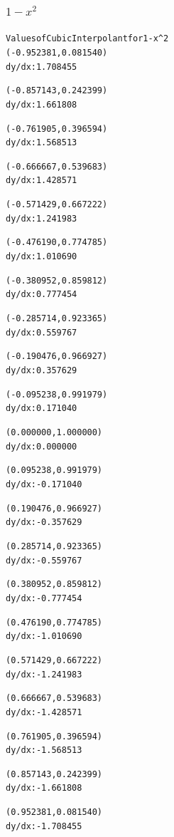 \documentclass[11pt]{article} %
\begin{document}
\subsubsection*{$1-x^2$}
\begin{alltt}
 Values of Cubic Interpolant for 1-x^2
(-0.952381, 0.081540)
 dy/dx:	1.708455

(-0.857143, 0.242399)
 dy/dx:	1.661808

(-0.761905, 0.396594)
 dy/dx:	1.568513

(-0.666667, 0.539683)
 dy/dx:	1.428571

(-0.571429, 0.667222)
 dy/dx:	1.241983

(-0.476190, 0.774785)
 dy/dx:	1.010690

(-0.380952, 0.859812)
 dy/dx:	0.777454

(-0.285714, 0.923365)
 dy/dx:	0.559767

(-0.190476, 0.966927)
 dy/dx:	0.357629

(-0.095238, 0.991979)
 dy/dx:	0.171040

(0.000000, 1.000000)
 dy/dx:	0.000000

(0.095238, 0.991979)
 dy/dx:	-0.171040

(0.190476, 0.966927)
 dy/dx:	-0.357629

(0.285714, 0.923365)
 dy/dx:	-0.559767

(0.380952, 0.859812)
 dy/dx:	-0.777454

(0.476190, 0.774785)
 dy/dx:	-1.010690

(0.571429, 0.667222)
 dy/dx:	-1.241983

(0.666667, 0.539683)
 dy/dx:	-1.428571

(0.761905, 0.396594)
 dy/dx:	-1.568513

(0.857143, 0.242399)
 dy/dx:	-1.661808

(0.952381, 0.081540)
 dy/dx:	-1.708455

\end{alltt}
\end{document}
